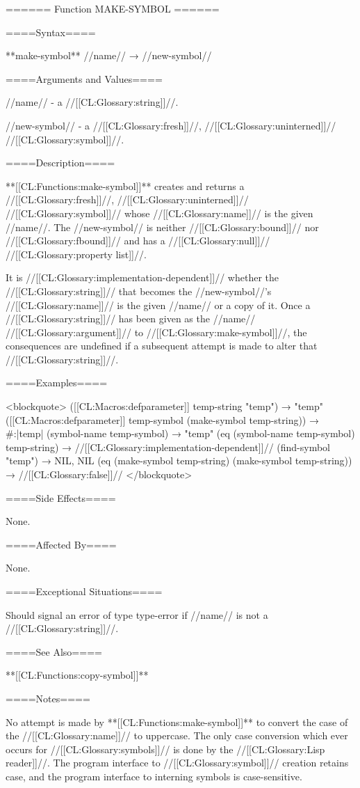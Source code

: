 ====== Function MAKE-SYMBOL ======

====Syntax====

**make-symbol** //name// → //new-symbol//

====Arguments and Values====

//name// - a //[[CL:Glossary:string]]//.

//new-symbol// - a //[[CL:Glossary:fresh]]//, //[[CL:Glossary:uninterned]]// //[[CL:Glossary:symbol]]//.

====Description====

**[[CL:Functions:make-symbol]]** creates and returns a //[[CL:Glossary:fresh]]//, //[[CL:Glossary:uninterned]]// //[[CL:Glossary:symbol]]// whose //[[CL:Glossary:name]]// is the given //name//. The //new-symbol// is neither //[[CL:Glossary:bound]]// nor //[[CL:Glossary:fbound]]// and has a //[[CL:Glossary:null]]// //[[CL:Glossary:property list]]//.

It is //[[CL:Glossary:implementation-dependent]]// whether the //[[CL:Glossary:string]]// that becomes the //new-symbol//'s //[[CL:Glossary:name]]// is the given //name// or a copy of it. Once a //[[CL:Glossary:string]]// has been given as the //name// //[[CL:Glossary:argument]]// to //[[CL:Glossary:make-symbol]]//, the consequences are undefined if a subsequent attempt is made to alter that //[[CL:Glossary:string]]//.

====Examples====

<blockquote> ([[CL:Macros:defparameter]] temp-string "temp") → "temp" ([[CL:Macros:defparameter]] temp-symbol (make-symbol temp-string)) → #:|temp| (symbol-name temp-symbol) → "temp" (eq (symbol-name temp-symbol) temp-string) → //[[CL:Glossary:implementation-dependent]]// (find-symbol "temp") → NIL, NIL (eq (make-symbol temp-string) (make-symbol temp-string)) → //[[CL:Glossary:false]]// </blockquote>

====Side Effects====

None.

====Affected By====

None.

====Exceptional Situations====

Should signal an error of type type-error if //name// is not a //[[CL:Glossary:string]]//.

====See Also====

**[[CL:Functions:copy-symbol]]**

====Notes====

No attempt is made by **[[CL:Functions:make-symbol]]** to convert the case of the //[[CL:Glossary:name]]// to uppercase. The only case conversion which ever occurs for //[[CL:Glossary:symbols]]// is done by the //[[CL:Glossary:Lisp reader]]//. The program interface to //[[CL:Glossary:symbol]]// creation retains case, and the program interface to interning symbols is case-sensitive.

